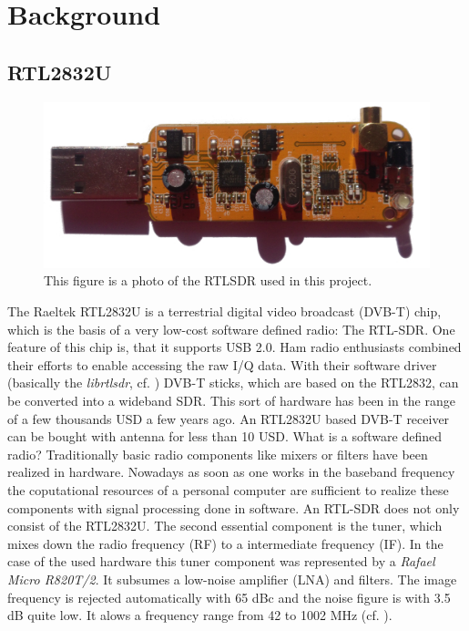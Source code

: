 \documentclass[conference]{IEEEtran}
\begin{document}

\section{Background}

\subsection{RTL2832U}
\label{sub:rtl2832}
\begin{figure}[h]
\centering
\includegraphics[width=0.5\columnwidth]{./fig/rtlsdr.jpg}
\caption{This figure is a photo of the RTLSDR used in this project.}
\label{fig:receiver_arch}
\end{figure}
The Raeltek RTL2832U is a terrestrial digital video broadcast (DVB-T) chip, which is the basis of a very low-cost software defined radio: The RTL-SDR. One feature of this chip is, that it supports USB 2.0. Ham radio enthusiasts combined their efforts to enable accessing the raw I/Q data. With their software driver (basically the \textit{librtlsdr}, cf. \cite{github:librtlsdr}) DVB-T sticks, which are based on the RTL2832, can be converted into a wideband SDR. This sort of hardware has been in the range of a few thousands USD a few years ago. An RTL2832U based DVB-T receiver can be bought with antenna for less than 10 USD. 
What is a software defined radio? Traditionally basic radio components like mixers or filters have been realized in hardware. Nowadays as soon as one works in the baseband frequency the coputational resources of a personal computer are sufficient to realize these components with signal processing done in software.
An RTL-SDR does not only consist of the RTL2832U. The second essential component is the tuner, which mixes down the radio frequency (RF) to a intermediate frequency (IF). In the case of the used hardware this tuner component was represented by a \textit{Rafael Micro R820T/2}. It subsumes a low-noise amplifier (LNA) and filters. The image frequency is rejected automatically with 65 dBc and the noise figure is with 3.5 dB quite low. It alows a frequency range from 42 to 1002 MHz (cf. \cite{rafael:r820t}). 
\end{document}
